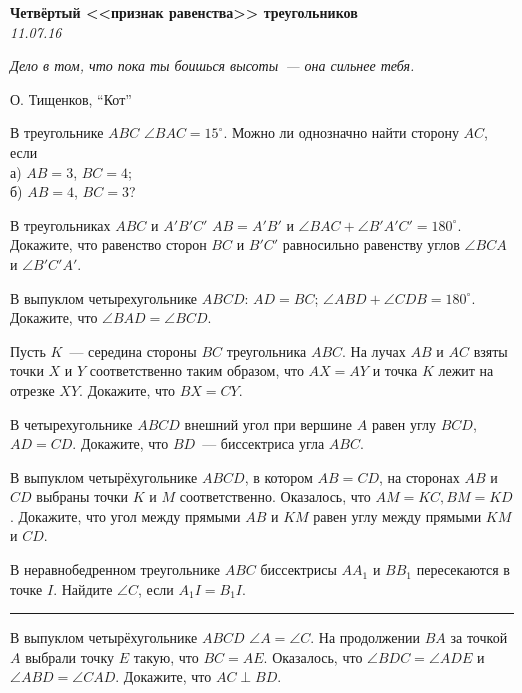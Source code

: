 \begin{center}
\textbf{\Large Четвёртый <<признак равенства>> треугольников}\\
\textit{11.07.16}
\end{center}

\epigraph{\it Дело в том, что пока ты боишься высоты~--- она сильнее тебя.}{О. Тищенков, ``Кот''}

\begin{problems}

\item В треугольнике $ABC$  $\angle BAC = 15^{\circ}$. Можно ли однозначно найти сторону $AC$, если\\
а) $AB = 3$, $BC = 4$;\\
б) $AB = 4$, $BC = 3$?

\item В треугольниках $ABC$ и $A'B'C'$  $AB=A'B'$ и $\angle BAC+\angle B'A'C'=180^{\circ}$. Докажите, что равенство сторон $BC$ и $B'C'$ равносильно равенству углов $\angle BCA$ и $\angle B'C'A'$.

\item В выпуклом четырехугольнике $ABCD$: $AD = BC$; $\angle ABD + \angle CDB = 180^{\circ}$. Докажите, что $\angle BAD = \angle BCD$.

\item Пусть $K$~--- середина стороны $BC$ треугольника $ABC$. На лучах $AB$ и $AC$ взяты точки $X$ и $Y$ соответственно таким образом, что $AX = AY$ и точка $K$ лежит на отрезке $XY$. Докажите, что $BX = CY$.

\item  В четырехугольнике $ABCD$ внешний угол при вершине $A$ равен углу $BCD$, $AD=CD$. Докажите, что $BD$~--- биссектриса угла $ABC$.

\item В выпуклом четырёхугольнике $ABCD$, в котором $AB = CD$, на сторонах $AB$ и $CD$ выбраны точки $K$ и $M$ соответственно. Оказалось, что $AM = KC, BM = KD$. Докажите, что угол между прямыми $AB$ и $KM$ равен углу между прямыми $KM$ и $CD$.

\item В неравнобедренном треугольнике $ABC$ биссектрисы $AA_1$ и $BB_1$ пересекаются в точке $I$. Найдите $\angle C$, 
если $A_1I=B_1I$.

\strut\hrule

\item В выпуклом четырёхугольнике $ABCD$ $\angle A=\angle C$. На продолжении $BA$ за точкой $A$ выбрали точку $E$ такую, что $BC=AE$. Оказалось, что $\angle BDC=\angle ADE$ и $\angle ABD= \angle CAD$. Докажите, что $AC \perp BD$.


\end{problems}
